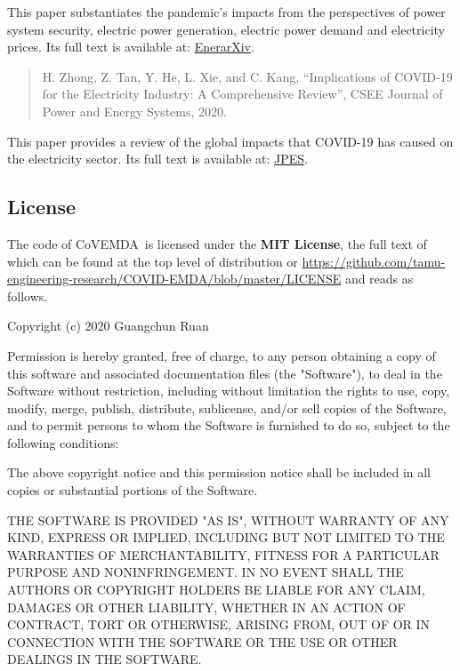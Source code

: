 \documentclass[11pt]{article}
\newcommand{\covemda}{CoVEMDA}
\numberwithin{equation}{section}
\numberwithin{table}{section}
\numberwithin{figure}{section}
\begin{document}
This paper substantiates the pandemic's impacts from the perspectives of power system security, electric power generation, electric power demand and electricity prices. Its full text is available at: \href{http://www.enerarxiv.org/page/thesis.html?id=2196}{EnerarXiv}.

\begin{quotation}\footnotesize
H. Zhong, Z. Tan, Y. He, L. Xie, and C. Kang, ``Implications of COVID-19 for the Electricity Industry: A Comprehensive Review'', CSEE Journal of Power and Energy Systems, 2020.
\end{quotation}

This paper provides a review of the global impacts that COVID-19 has caused on the electricity sector. Its full text is available at: \href{https://ieeexplore.ieee.org/abstract/document/9160443}{JPES}.

\subsection{License}
The code of \covemda~is licensed under the \textbf{MIT License}, the full text of which can be found at the top level of distribution or \url{https://github.com/tamu-engineering-research/COVID-EMDA/blob/master/LICENSE} and reads as follows.
\begin{Notice}
Copyright (c) 2020 Guangchun Ruan

Permission is hereby granted, free of charge, to any person obtaining a copy
of this software and associated documentation files (the "Software"), to deal
in the Software without restriction, including without limitation the rights
to use, copy, modify, merge, publish, distribute, sublicense, and/or sell
copies of the Software, and to permit persons to whom the Software is
furnished to do so, subject to the following conditions:

The above copyright notice and this permission notice shall be included in all
copies or substantial portions of the Software.

THE SOFTWARE IS PROVIDED "AS IS", WITHOUT WARRANTY OF ANY KIND, EXPRESS OR
IMPLIED, INCLUDING BUT NOT LIMITED TO THE WARRANTIES OF MERCHANTABILITY,
FITNESS FOR A PARTICULAR PURPOSE AND NONINFRINGEMENT. IN NO EVENT SHALL THE
AUTHORS OR COPYRIGHT HOLDERS BE LIABLE FOR ANY CLAIM, DAMAGES OR OTHER
LIABILITY, WHETHER IN AN ACTION OF CONTRACT, TORT OR OTHERWISE, ARISING FROM,
OUT OF OR IN CONNECTION WITH THE SOFTWARE OR THE USE OR OTHER DEALINGS IN THE
SOFTWARE.
\end{Notice}
\end{document}
